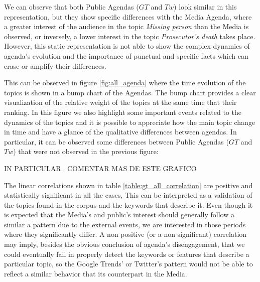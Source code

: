 \documentclass{bmcart}
\begin{document}
\par We can observe that both Public Agendas ($GT$ and $Tw$) look similar in this representation, but they show specific differences with the Media Agenda, where a greater interest of the audience in the topic \emph{Missing person} than the Media is observed, or inversely, a lower interest in the topic \emph{Prosecutor's death} takes place. However, this static representation is not able to show the complex dynamics of agenda's evolution and the importance of punctual and specific facts which can erase or amplify their differences. 

\par This can be observed in figure \ref{fig:all_agenda} where the time evolution of the topics is shown in a bump chart of the Agendas. The bump chart provides  a clear visualization of the relative weight of the topics at the same time that their ranking. In  this figure  we also highlight some important events related to the dynamics of the topics and  it is  possible to appreciate how the main topic change in time and have a glance of the qualitative differences between agendas. In particular, it can be observed some differences between Public Agendas ($GT$ and $Tw$) that were not observed in the previous figure: 

IN PARTICULAR.. COMENTAR MAS DE ESTE GRAFICO

\par The linear correlations shown in table \ref{table:gt_all_correlation} are  positive and statistically significant in all the cases, This can be interpreted as a validation of the topics found in the corpus and the keywords that describe it. Even though it is expected that the Media's and public's interest should generally follow a similar a pattern due to the external events, we are interested in those periods where they significantly differ. 
A non positive (or a non significant) correlation may imply, besides the obvious conclusion of agenda's disengagement, that we could eventually fail in properly detect the keywords or features that describe a particular topic, so the Google Trends' or Twitter's pattern would not be able to reflect a similar behavior that its counterpart in the Media.

\end{document}
